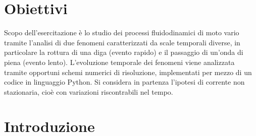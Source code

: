 \documentclass[12pt]{article} %
\begin{document}
\newpage
\thispagestyle{empty}
\tableofcontents

\newpage
\listoffigures

\newpage
\section{Obiettivi}
\noindent Scopo dell’esercitazione è lo studio dei processi fluidodinamici di moto vario tramite l’analisi di due fenomeni caratterizzati da scale temporali diverse, in particolare la rottura di una diga (evento rapido) e il passaggio di un’onda di piena (evento lento).
L’evoluzione temporale dei fenomeni viene analizzata tramite opportuni schemi numerici di risoluzione, implementati per mezzo di un codice in linguaggio Python.
Si considera in partenza l’ipotesi di corrente non stazionaria, cioè con variazioni riscontrabili nel tempo.

\newpage
\section{Introduzione}
\end{document}
